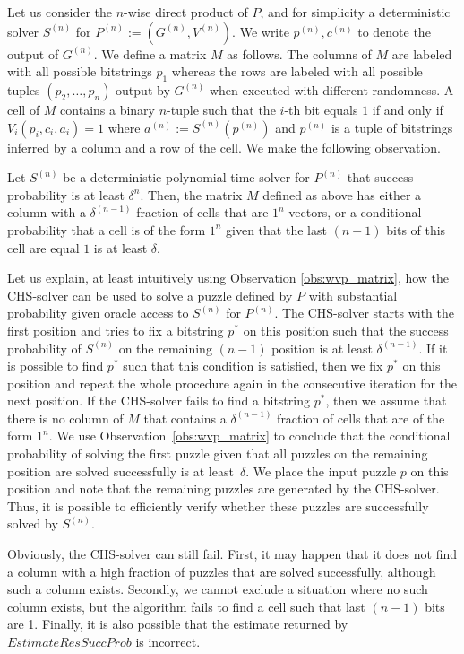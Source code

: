 Let us consider the $n$-wise direct product of $P$, and for simplicity a deterministic solver $S^{(n)}$ for $P^{(n)} := (G^{(n)}, V^{(n)})$.
We write $p^{(n)}, c^{(n)}$ to denote the output of $G^{(n)}$.
We define a matrix $M$ as follows. The columns of $M$ are labeled with all possible bitstrings $p_1$
whereas the rows are labeled with all possible tuples $(p_2, \dotsc, p_n)$ output by $G^{(n)}$ when executed with different randomness.
A cell of $M$ contains a binary $n$-tuple such that the $i$-th bit equals $1$ if and only if $V_i(p_i, c_i, a_i) = 1$ where
 $a^{(n)} := S^{(n)}(p^{(n)})$ and $p^{(n)}$ is a tuple of bitstrings inferred by a column and a row of the cell.
We make the following observation.
%
\begin{observation}
\label{obs:wvp_matrix}
Let $S^{(n)}$ be a deterministic polynomial time solver for $P^{(n)}$ that success probability is at least $\delta^{n}$.
Then, the matrix $M$ defined as above has either a column with a $\delta^{(n-1)}$ fraction of cells that are $1^n$ vectors, or
a conditional probability that a cell is of the form $1^n$ given that the last $(n-1)$ bits of this cell are equal $1$ is at least $\delta$.
\end{observation}
%
Let us explain, at least intuitively using Observation \ref{obs:wvp_matrix}, how the CHS-solver can be used to solve a puzzle defined by $P$
with substantial probability given oracle access to $S^{(n)}$ for $P^{(n)}$.
The CHS-solver starts with the first position and tries to fix a bitstring $p^*$ on this position such that the success probability of $S^{(n)}$ on the remaining $(n-1)$
position is at least $\delta^{(n-1)}$. If it is possible to find $p^*$ such that this condition is satisfied, then we fix $p^*$
on this position and repeat the whole procedure again in the consecutive iteration for the next position.
If the CHS-solver fails to find a bitstring $p^*$, then we assume that there is no column of $M$ that contains a $\delta^{(n-1)}$ fraction
of cells that are of the form $1^n$. We use Observation~\ref{obs:wvp_matrix} to conclude that the conditional probability of
solving the first puzzle given that all puzzles on the remaining position are solved successfully is at least~$\delta$.
We place the input puzzle $p$ on this position and note that the remaining puzzles are generated by the CHS-solver.
Thus, it is possible to efficiently verify whether these puzzles are successfully solved by $S^{(n)}$.

Obviously, the CHS-solver can still fail. First, it may happen that it does not find a column
with a high fraction of puzzles that are solved successfully, although such a column exists.
Secondly, we cannot exclude a situation where no such column exists, but the algorithm fails to find a cell such that last $(n\!-\!1)$ bits are 1.
Finally, it is also possible that the estimate returned by $\mathit{EstimateResSuccProb}$ is incorrect.

